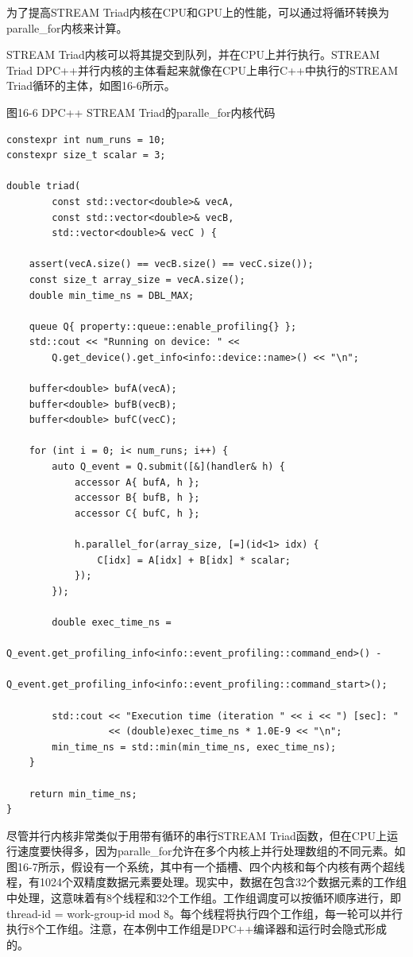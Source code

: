 为了提高STREAM Triad内核在CPU和GPU上的性能，可以通过将循环转换为paralle\_for内核来计算。\par

STREAM Triad内核可以将其提交到队列，并在CPU上并行执行。STREAM Triad DPC++并行内核的主体看起来就像在CPU上串行C++中执行的STREAM Triad循环的主体，如图16-6所示。\par

\hspace*{\fill} \par %
图16-6 DPC++ STREAM Triad的paralle\_for内核代码
\begin{lstlisting}[caption={}]
constexpr int num_runs = 10;
constexpr size_t scalar = 3;

double triad(
		const std::vector<double>& vecA,
		const std::vector<double>& vecB,
		std::vector<double>& vecC ) {
			
	assert(vecA.size() == vecB.size() == vecC.size());
	const size_t array_size = vecA.size();
	double min_time_ns = DBL_MAX;
	
	queue Q{ property::queue::enable_profiling{} };
	std::cout << "Running on device: " <<
		Q.get_device().get_info<info::device::name>() << "\n";
	
	buffer<double> bufA(vecA);
	buffer<double> bufB(vecB);
	buffer<double> bufC(vecC);
	
	for (int i = 0; i< num_runs; i++) {
		auto Q_event = Q.submit([&](handler& h) {
			accessor A{ bufA, h };
			accessor B{ bufB, h };
			accessor C{ bufC, h };
			
			h.parallel_for(array_size, [=](id<1> idx) {
				C[idx] = A[idx] + B[idx] * scalar;
			});
		});
	
		double exec_time_ns =
			Q_event.get_profiling_info<info::event_profiling::command_end>() -
			Q_event.get_profiling_info<info::event_profiling::command_start>();
		
		std::cout << "Execution time (iteration " << i << ") [sec]: "
				  << (double)exec_time_ns * 1.0E-9 << "\n";
		min_time_ns = std::min(min_time_ns, exec_time_ns);
	}

	return min_time_ns;
}
\end{lstlisting}

尽管并行内核非常类似于用带有循环的串行STREAM Triad函数，但在CPU上运行速度要快得多，因为paralle\_for允许在多个内核上并行处理数组的不同元素。如图16-7所示，假设有一个系统，其中有一个插槽、四个内核和每个内核有两个超线程，有1024个双精度数据元素要处理。现实中，数据在包含32个数据元素的工作组中处理，这意味着有8个线程和32个工作组。工作组调度可以按循环顺序进行，即thread-id = work-group-id mod 8。每个线程将执行四个工作组，每一轮可以并行执行8个工作组。注意，在本例中工作组是DPC++编译器和运行时会隐式形成的。\par

